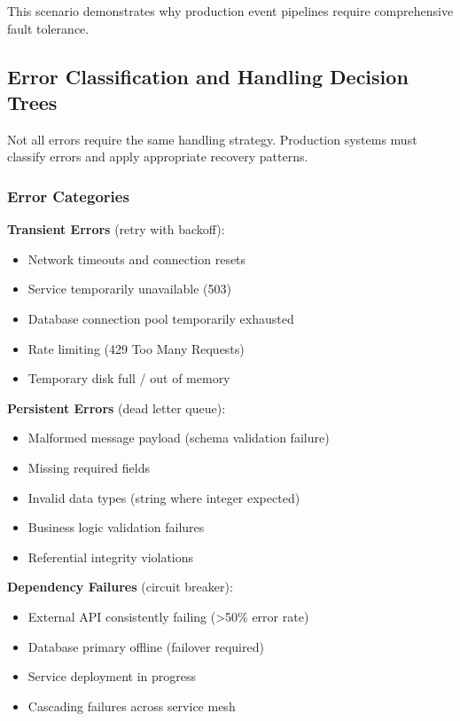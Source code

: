 This scenario demonstrates why production event pipelines require comprehensive fault tolerance.

\subsection{Error Classification and Handling Decision Trees}

Not all errors require the same handling strategy. Production systems must classify errors and apply appropriate recovery patterns.

\subsubsection{Error Categories}

\textbf{Transient Errors} (retry with backoff):
\begin{itemize}
    \item Network timeouts and connection resets
    \item Service temporarily unavailable (503)
    \item Database connection pool temporarily exhausted
    \item Rate limiting (429 Too Many Requests)
    \item Temporary disk full / out of memory
\end{itemize}

\textbf{Persistent Errors} (dead letter queue):
\begin{itemize}
    \item Malformed message payload (schema validation failure)
    \item Missing required fields
    \item Invalid data types (string where integer expected)
    \item Business logic validation failures
    \item Referential integrity violations
\end{itemize}

\textbf{Dependency Failures} (circuit breaker):
\begin{itemize}
    \item External API consistently failing (>50\% error rate)
    \item Database primary offline (failover required)
    \item Service deployment in progress
    \item Cascading failures across service mesh
\end{itemize}

